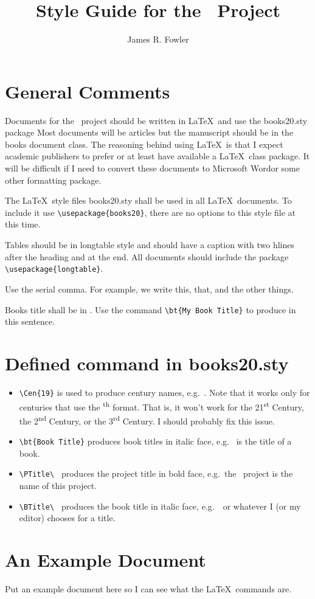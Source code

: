\documentclass{article}
\begin{document}
\title{Style Guide for the \PTitle\ Project}
\author{James R. Fowler}

\maketitle

\section{General Comments}

Documents for the \PTitle\ project should be written in \LaTeX\ and use
the books20.sty package Most documents will be articles but the
manuscript should be in the books document class. The reasoning behind
using \LaTeX\ is that I expect academic publishers to prefer or at
least have available a \LaTeX\ class package.  It will be difficult if
I need to convert these documents to Microsoft Word\texttrademark or
some other formatting package.

The \LaTeX\ style files books20.sty shall be used in all
\LaTeX\ documents. To include it use \verb|\usepackage{books20}|, there
are no options to this style file at this time.

Tables should be in longtable style and should have a caption with two
hlines after the heading and at the end.  All documents should include
the package \verb|\usepackage{longtable}|.

Use the serial comma. For example, we write this, that, and the other
things.

Books title shall be in . Use the command
\verb|\bt{My Book Title}| to produce  in this
sentence.

\section{Defined command in books20.sty}

\begin{itemize}

\item \verb|\Cen{19}| is used to produce century names,
  e.g.\ . Note that it works only for centuries that use the
  \textsuperscript{th} format.  That is, it won't work for the
  21\textsuperscript{st} Century, the 2\textsuperscript{nd} Century, or the
  3\textsuperscript{rd} Century. I should probably fix this issue.

\item \verb|\bt{Book Title}| produces book titles in italic face,
e.g.\  is the title of a book.

\item \verb|\PTitle\ | produces the project title in bold face,
  e.g.\ the \PTitle\ project is the name of this project.

\item \verb|\BTitle\ | produces the book title in italic face, e.g.\ \BTitle\ or whatever I (or my editor) chooses for a title.

\end{itemize}

\section{An Example Document}

Put an example document here so I can see what the \LaTeX\ commands are.
\end{document}

